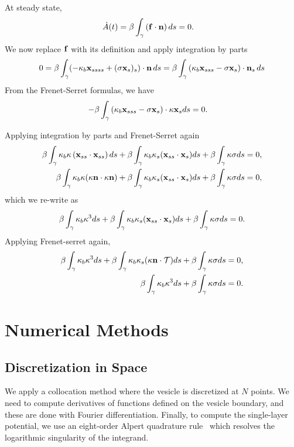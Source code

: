 \documentclass[aps,prl,showpacs]{revtex4}
\begin{document}
At steady state,
\begin{align}
    \dot{A}(t) &= \beta \int_{\gamma}\left(\mathbf{f}\cdot\mathbf{n}\right)ds =0.
\end{align}
We now replace $\mathbf{f}$ with its definition and apply integration by parts
\begin{align}
   0=\beta\int_{\gamma} 
    (-\kappa_b\mathbf{x}_{ssss}+(\sigma\mathbf{x}_s)_s)\cdot\mathbf{n}\, ds =
   \beta\int_{\gamma}\left(\kappa_b\mathbf{x}_{sss}-\sigma\mathbf{x}_s\right)\cdot
     \mathbf{n}_s\, ds
\end{align}
From the Frenet-Serret formulas, we have 
\begin{align}
     -\beta\int_{\gamma}
     \left(\kappa_b\mathbf{x}_{sss}-\sigma\mathbf{x}_s\right)\cdot\kappa\mathbf{x}_s ds &=0.
\end{align}

Applying integration by parts and Frenet-Serret again
\begin{align}
     \beta\int_{\gamma}
     \kappa_b\kappa\left(\mathbf{x}_{ss}\cdot\mathbf{x}_{ss}\right)ds + \beta
     \int_{\gamma} \kappa_b \kappa_s(\mathbf{x}_{ss} \cdot \mathbf{x}_s)ds +\beta\int_{\gamma}\kappa\sigma ds  &= 0,\\
    \beta\int_{\gamma} \kappa_b\kappa(\kappa\mathbf{n} \cdot
     \kappa\mathbf{n})+ \beta \int_{\gamma} \kappa_b \kappa_s(\mathbf{x}_{ss} \cdot
     \mathbf{x}_s)ds +\beta\int_{\gamma}\kappa\sigma ds &= 0,
\end{align}
which we re-write as
\begin{align}
   \beta\int_{\gamma}\kappa_b\kappa^3 ds + \beta \int_{\gamma} \kappa_b
   \kappa_s(\mathbf{x}_{ss} \cdot \mathbf{x}_s)ds +\beta\int_{\gamma} \kappa\sigma ds = 0.
\end{align}
Applying Frenet-serret again,
\begin{align}
    \beta\int_{\gamma}\kappa_b\kappa^3 ds + \beta \int_{\gamma} \kappa_b
    \kappa_s(\kappa\mathbf{n} \cdot \mathcal{T})ds +\beta\int_{\gamma} \kappa\sigma ds = 0, \\
    \beta\int_{\gamma}\kappa_b\kappa^3 ds +\beta\int_{\gamma} \kappa\sigma ds  = 0.
\end{align}


\section{Numerical Methods}
\subsection{Discretization in Space}
We apply a collocation method where the vesicle is discretized at $N$
points. We need to compute derivatives of functions defined on the
vesicle boundary, and these are done with Fourier differentiation.
Finally, to compute the single-layer potential, we use an eight-order
Alpert quadrature rule~\cite{alp1999} which resolves the logarithmic
singularity of the integrand.
\end{document}
